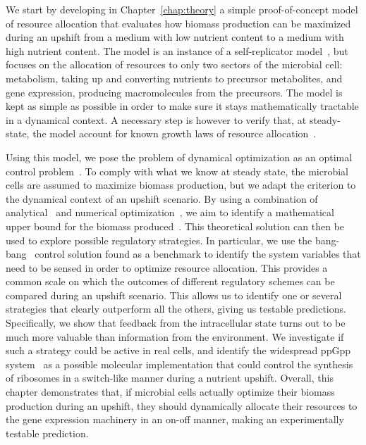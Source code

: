 We start by developing in Chapter~\ref{chap:theory} a simple proof-of-concept model of resource allocation that evaluates how biomass production can be maximized during an upshift from a medium with low nutrient content to a medium with high nutrient content.
The model is an instance of a self-replicator model~\cite{molenaar_shifts_2009}, but focuses on the allocation of resources to only two sectors of the microbial cell: metabolism, taking up and converting nutrients to precursor metabolites, and gene expression, producing macromolecules from the precursors.
The model is kept as simple as possible in order to make sure it stays mathematically tractable in a dynamical context.
A necessary step is however to verify that, at steady-state, the model account for known growth laws of resource allocation~\cite{scott_interdependence_2010,scott_bacterial_2011}.

Using this model, we pose the problem of dynamical optimization as an optimal control problem~\cite{stengel_optimal_1994}.
To comply with what we know at steady state, the microbial cells are assumed to maximize biomass production, but we adapt the criterion to the dynamical context of an upshift scenario.
By using a combination of analytical~\cite{carlson_infinite_1991} and numerical optimization~\cite{bonnans_bocop_2012}, we aim to identify a mathematical upper bound for the biomass produced~\cite{stengel_optimal_1994}.
This theoretical solution can then be used to explore possible regulatory strategies.
In particular, we use the bang-bang~\cite{stengel_optimal_1994} control solution found as a benchmark to identify the system variables that need to be sensed in order to optimize resource allocation.
This provides a common scale on which the outcomes of different regulatory schemes can be compared during an upshift scenario.
This allows us to identify one or several strategies that clearly outperform all the others, giving us testable predictions.
Specifically, we show that feedback from the intracellular state turns out to be much more valuable than information from the environment.
We investigate if such a strategy could be active in real cells, and identify the widespread ppGpp system~\cite{bosdriesz_how_2015} as a possible molecular implementation that could control the synthesis of ribosomes in a switch-like manner during a nutrient upshift.
Overall, this chapter demonstrates that, if microbial cells actually optimize their biomass production during an upshift, they should dynamically allocate their resources to the gene expression machinery in an on-off manner, making an experimentally testable prediction.


